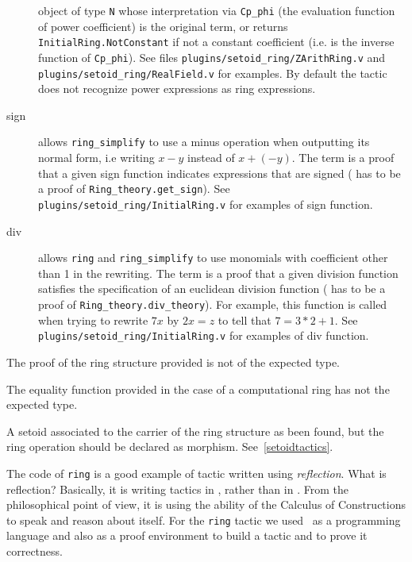 \begin{description}
  object of type {\tt N} whose interpretation via {\tt Cp\_phi} (the
  evaluation function of power coefficient) is the original term, or
  returns {\tt InitialRing.NotConstant} if not a constant coefficient
  (i.e. {\ltac} is the inverse function of {\tt Cp\_phi}).
  See files {\tt plugins/setoid\_ring/ZArithRing.v} and
  {\tt plugins/setoid\_ring/RealField.v} for examples.
  By default the tactic does not recognize power expressions as ring
  expressions.
\item[sign {\term}] allows {\tt ring\_simplify} to use a minus operation
  when outputting its normal form, i.e writing $x - y$ instead of $x + (-y)$.
  The term {\term} is a proof that a given sign function indicates expressions
   that are signed ({\term} has to be a
  proof of {\tt Ring\_theory.get\_sign}). See  {\tt plugins/setoid\_ring/InitialRing.v} for examples of sign function.
\item[div {\term}] allows  {\tt ring} and {\tt ring\_simplify} to use monomials
with coefficient other than 1 in the rewriting. The term {\term} is a proof that a given division function  satisfies the specification of an euclidean
  division function  ({\term} has to be a
  proof of {\tt Ring\_theory.div\_theory}). For example, this function is
  called when trying to rewrite $7x$ by $2x = z$ to tell that $7 = 3 * 2 + 1$.
   See  {\tt plugins/setoid\_ring/InitialRing.v} for examples of div function.

\end{description}


\begin{ErrMsgs}
\item {}
  The proof of the ring structure provided is not of the expected type.
\item {}
  The equality function provided in the case of a computational ring
  has not the expected type.
\item {}
  A setoid associated to the carrier of the ring structure as been
  found, but the ring operation should be declared as
  morphism. See~\ref{setoidtactics}.
\end{ErrMsgs}


The code of \texttt{ring} is a good example of tactic written using
\textit{reflection}.  What is reflection? Basically, it is writing
\Coq{} tactics in \Coq, rather than in \ocaml. From the philosophical
point of view, it is using the ability of the Calculus of
Constructions to speak and reason about itself.  For the \texttt{ring}
tactic we used \Coq\ as a programming language and also as a proof
environment to build a tactic and to prove it correctness.

